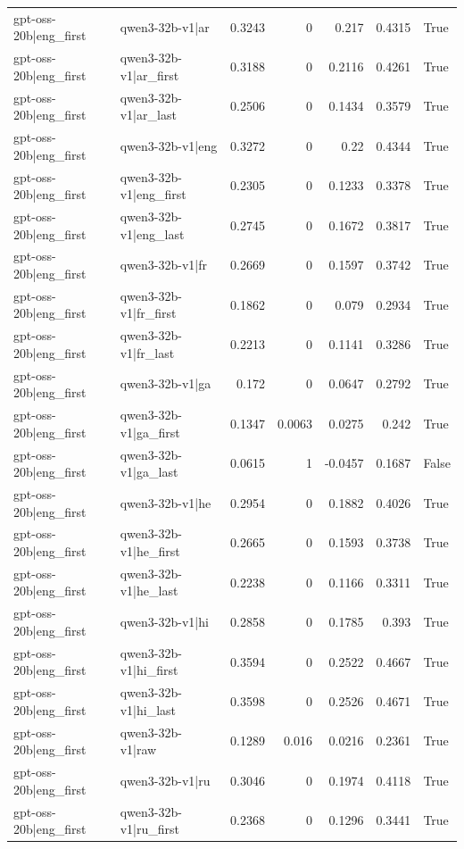 \begin{table}
\begin{tabular}{l l r r r r l}
gpt-oss-20b|eng_first & qwen3-32b-v1|ar & 0.3243 & 0 & 0.217 & 0.4315 & True \\
gpt-oss-20b|eng_first & qwen3-32b-v1|ar_first & 0.3188 & 0 & 0.2116 & 0.4261 & True \\
gpt-oss-20b|eng_first & qwen3-32b-v1|ar_last & 0.2506 & 0 & 0.1434 & 0.3579 & True \\
gpt-oss-20b|eng_first & qwen3-32b-v1|eng & 0.3272 & 0 & 0.22 & 0.4344 & True \\
gpt-oss-20b|eng_first & qwen3-32b-v1|eng_first & 0.2305 & 0 & 0.1233 & 0.3378 & True \\
gpt-oss-20b|eng_first & qwen3-32b-v1|eng_last & 0.2745 & 0 & 0.1672 & 0.3817 & True \\
gpt-oss-20b|eng_first & qwen3-32b-v1|fr & 0.2669 & 0 & 0.1597 & 0.3742 & True \\
gpt-oss-20b|eng_first & qwen3-32b-v1|fr_first & 0.1862 & 0 & 0.079 & 0.2934 & True \\
gpt-oss-20b|eng_first & qwen3-32b-v1|fr_last & 0.2213 & 0 & 0.1141 & 0.3286 & True \\
gpt-oss-20b|eng_first & qwen3-32b-v1|ga & 0.172 & 0 & 0.0647 & 0.2792 & True \\
gpt-oss-20b|eng_first & qwen3-32b-v1|ga_first & 0.1347 & 0.0063 & 0.0275 & 0.242 & True \\
gpt-oss-20b|eng_first & qwen3-32b-v1|ga_last & 0.0615 & 1 & -0.0457 & 0.1687 & False \\
gpt-oss-20b|eng_first & qwen3-32b-v1|he & 0.2954 & 0 & 0.1882 & 0.4026 & True \\
gpt-oss-20b|eng_first & qwen3-32b-v1|he_first & 0.2665 & 0 & 0.1593 & 0.3738 & True \\
gpt-oss-20b|eng_first & qwen3-32b-v1|he_last & 0.2238 & 0 & 0.1166 & 0.3311 & True \\
gpt-oss-20b|eng_first & qwen3-32b-v1|hi & 0.2858 & 0 & 0.1785 & 0.393 & True \\
gpt-oss-20b|eng_first & qwen3-32b-v1|hi_first & 0.3594 & 0 & 0.2522 & 0.4667 & True \\
gpt-oss-20b|eng_first & qwen3-32b-v1|hi_last & 0.3598 & 0 & 0.2526 & 0.4671 & True \\
gpt-oss-20b|eng_first & qwen3-32b-v1|raw & 0.1289 & 0.016 & 0.0216 & 0.2361 & True \\
gpt-oss-20b|eng_first & qwen3-32b-v1|ru & 0.3046 & 0 & 0.1974 & 0.4118 & True \\
gpt-oss-20b|eng_first & qwen3-32b-v1|ru_first & 0.2368 & 0 & 0.1296 & 0.3441 & True \\

\end{tabular}
\end{table}
